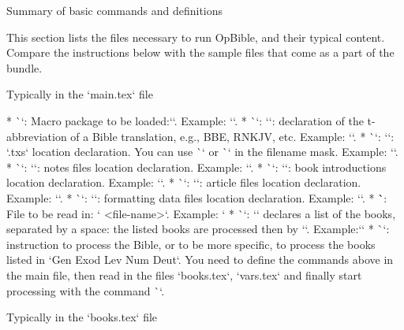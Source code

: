 {{%
\sec[sum] Summary of basic commands and definitions

This section lists the files necessary to run OpBible, and their typical content.
\recommended
Compare the instructions below with the sample files that come as a part of the bundle. 



\secc Typically in the `main.tex` file

\begitems
* \`\load`: Macro package to be loaded:``. Example: `\load [opbible]`.
* \`\tmark`: `\def\tmark{<t-abbreviation>}`: declaration of the t-abbreviation of a Bible 
translation, e.g., BBE, RNKJV, etc. 
   Example: `\def\tmark{BBE}`.
* \`\txsfile`: `\def\txsfile {<filename mask>}`: `.txs` location declaration. 
    You can use \`\amark` or \`\bmark` in the filename mask. 
    Example: `\def\txsfile {./txs/\tmark-\bmark.txs}`.
* \`\notesfile`: `\def\notesfile {<filename mask>}`:  notes files location declaration. 
Example: 
`\def\notesfile {./notes/notes-\amark.tex}`.
* \`\introfile`: `\def\introfile {<filename mask>}`:  book introductions location 
declaration. 
Example: `\def\introfile {./intros/intro-\amark.tex}`.
* \`\articlefile`: `\def\articlefile {<filename mask>}`: article files location declaration. 
   Example: `\def\articlefile {./articles/articles-\amark.tex}`.
* \`\fmtfile`: `\def\fmtfile {<filename mask>}`:  formatting data files location declaration. 
Example: `\def\fmtfile {./fmt/fmt-\tmark-\amark.tex}`.
* \``: File to be read in: ` {<file-name>}`. Example: `
* \`\printedbooks`: `\def\printedbooks {<list of a-marks>}` declares a list of the books, 
separated by a space:   the listed books are processed then by `\processbooks`. 
Example:\nl `\def\printedbooks {Gen Exod Lev Num Deut}`
* \`\processbooks`: instruction to process the Bible, or to be more  specific, to process the books 
listed in `\printedbooks`.
\enditems
You need to define the commands above in the main file, then
read in the files `books.tex`, `vars.tex` and finally start processing with the command
\`\processbooks`.

\secc Typically in the `books.tex` file

}}
